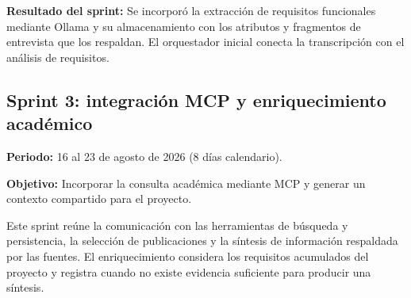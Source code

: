 \noindent\textbf{Resultado del sprint:}
Se incorporó la extracción de requisitos funcionales
mediante Ollama y su almacenamiento con los atributos
y fragmentos de entrevista que los respaldan.
El orquestador inicial conecta la transcripción
con el análisis de requisitos.

\subsection{Sprint 3: integración MCP y enriquecimiento académico}

\noindent\textbf{Periodo:}
16 al 23 de agosto de 2026
(8 días calendario).

\medskip
\noindent\textbf{Objetivo:}
Incorporar la consulta académica mediante MCP
y generar un contexto compartido para el proyecto.

Este sprint reúne la comunicación con las herramientas
de búsqueda y persistencia, la selección de publicaciones
y la síntesis de información respaldada por las fuentes.
El enriquecimiento considera los requisitos acumulados
del proyecto y registra cuando no existe evidencia
suficiente para producir una síntesis.

